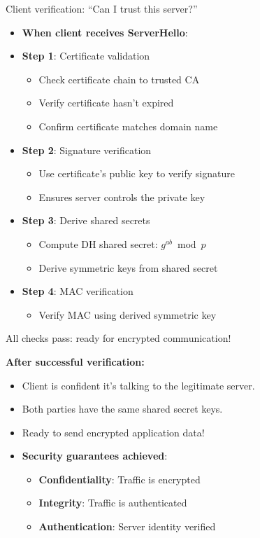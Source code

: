 \ifdefined\PRESENTATION\else\PassOptionsToClass{handout}{beamer}\fi\documentclass[aspectratio=169, lualatex]{beamer}
\begin{document}
\begin{frame}{Client verification: ``Can I trust this server?''}
	\begin{itemize}[<+->]
		\item \textbf{When client receives ServerHello}:
		\item \textbf{Step 1}: Certificate validation
		      \begin{itemize}
			      \item Check certificate chain to trusted CA
			      \item Verify certificate hasn't expired
			      \item Confirm certificate matches domain name
		      \end{itemize}
		\item \textbf{Step 2}: Signature verification
		      \begin{itemize}
			      \item Use certificate's public key to verify signature
			      \item Ensures server controls the private key
		      \end{itemize}
		\item \textbf{Step 3}: Derive shared secrets
		      \begin{itemize}
			      \item Compute DH shared secret: $g^{ab} \bmod p$
			      \item Derive symmetric keys from shared secret
		      \end{itemize}
		\item \textbf{Step 4}: MAC verification
		      \begin{itemize}
			      \item Verify MAC using derived symmetric key
		      \end{itemize}
	\end{itemize}
\end{frame}

\begin{frame}{All checks pass: ready for encrypted communication!}
	\begin{center}
		\textbf{After successful verification:}
	\end{center}
	\begin{itemize}[<+->]
		\item Client is confident it's talking to the legitimate server.
		\item Both parties have the same shared secret keys.
		\item Ready to send encrypted application data!
		\item \textbf{Security guarantees achieved}:
		      \begin{itemize}
			      \item \textbf{Confidentiality}: Traffic is encrypted
			      \item \textbf{Integrity}: Traffic is authenticated
			      \item \textbf{Authentication}: Server identity verified
		      \end{itemize}
	\end{itemize}
\end{frame}
\end{document}
